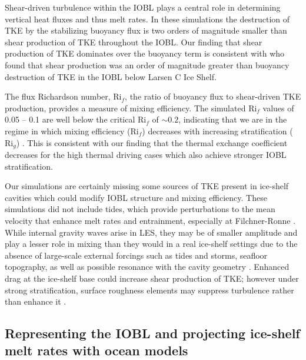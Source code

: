 \documentclass[draft]{agujournal2019}
\begin{document}
Shear-driven turbulence within the IOBL plays a central role in determining vertical heat fluxes and thus melt rates. In these simulations the destruction of TKE by the stabilizing buoyancy flux is two orders of magnitude smaller than shear production of TKE throughout the IOBL. Our finding that shear production of TKE dominates over the buoyancy term is consistent with  who found that shear production was an order of magnitude greater than buoyancy destruction of TKE in the IOBL below Larsen C Ice Shelf. 

The flux Richardson number, $\text{Ri}_f$, the ratio of buoyancy flux to shear-driven TKE production, provides a measure of mixing efficiency. The simulated $\text{Ri}_f$ values of 0.05 -- 0.1 are well below the critical $\text{Ri}_f$ of $\sim\!0.2$, indicating that we are in the regime in which mixing efficiency ($\text{Ri}_f$) decreases with increasing stratification ($\text{Ri}_g$) \cite{armenio_investigation_2002, peltier_mixing_2003}. This is consistent with our finding that the thermal exchange coefficient decreases for the high thermal driving cases which also achieve stronger IOBL stratification.

Our simulations are certainly missing some sources of TKE present in ice-shelf cavities which could modify IOBL structure and mixing efficiency. These simulations did not include tides, which provide perturbations to the mean velocity that enhance melt rates and entrainment, especially at Filchner-Ronne \cite{makinson_modeling_1999, makinson_influence_2011, mueller_tidal_2018}. While internal gravity waves arise in LES, they may be of smaller amplitude and play a lesser role in mixing than they would in a real ice-shelf settings due to the absence of large-scale external forcings such as tides and storms, seafloor topography, as well as possible resonance with the cavity geometry \cite{gwyther_cold_2020, robertson_tidally_2013, padman_ocean_2018, mueller_impact_2012}. Enhanced drag at the ice-shelf base could increase shear production of TKE; however under strong stratification, surface roughness elements may suppress turbulence rather than enhance it \cite{ohya_wind-tunnel_2001}. 

\subsection{Representing the IOBL and projecting ice-shelf melt rates with ocean models}\label{disc:prm}
\end{document}
